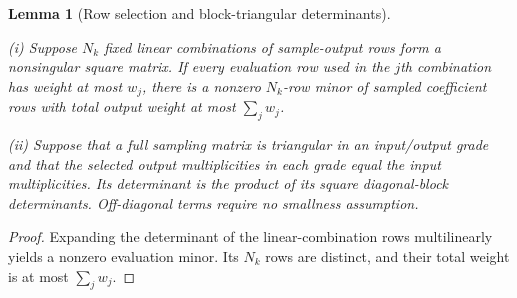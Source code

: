\documentclass[11pt]{amsart}
\newtheorem{lemma}[theorem]{Lemma}
\theoremstyle{definition}
\theoremstyle{remark}
\numberwithin{equation}{section}
\begin{document}
\begin{lemma}[Row selection and block-triangular determinants]\label{reg:lem:transfer}

\leavevmode\noindent\textup{(i)} Suppose $N_k$ fixed linear combinations of sample-output rows form a nonsingular square matrix. If every evaluation row used in the $j$th combination has weight at most $w_j$, there is a nonzero $N_k$-row minor of sampled coefficient rows with total output weight at most $\sum_jw_j$.

\noindent\textup{(ii)} Suppose that a full sampling matrix is triangular in an input/output grade and that the selected output multiplicities in each grade equal the input multiplicities. Its determinant is the product of its square diagonal-block determinants. Off-diagonal terms require no smallness assumption.
\end{lemma}
\begin{proof}
Expanding the determinant of the linear-combination rows multilinearly yields a nonzero evaluation minor. Its $N_k$ rows are distinct, and their total weight is at most $\sum_jw_j$.
\end{proof}
\end{document}
